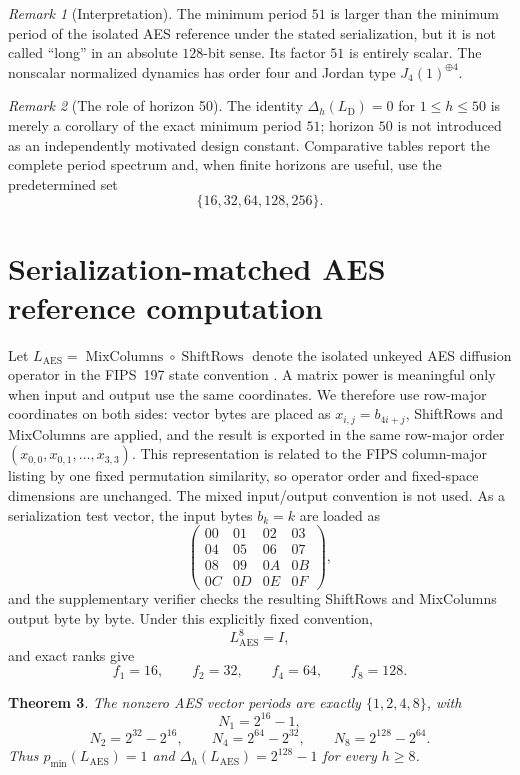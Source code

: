 \documentclass[10pt,reqno]{amsart}
\theoremstyle{plain}
\newtheorem{theorem}{Theorem}[section]
\theoremstyle{remark}\newtheorem{remark}[theorem]{Remark}
\theoremstyle{definition}\newtheorem{definition}[theorem]{Definition}
\newcommand{\AES}{\mathrm{AES}}
\begin{document}
\begin{remark}[Interpretation]
The minimum period $51$ is larger than the minimum period of the isolated AES reference under the stated serialization, but it is not called ``long'' in an absolute $128$-bit sense. Its factor $51$ is entirely scalar. The nonscalar normalized dynamics has order four and Jordan type $J_4(1)^{\oplus4}$.
\end{remark}

\begin{remark}[The role of horizon 50]
The identity $\Delta_h(L_{\mathrm{D}})=0$ for $1\le h\le50$ is merely a corollary of the exact minimum period $51$; horizon $50$ is not introduced as an independently motivated design constant. Comparative tables report the complete period spectrum and, when finite horizons are useful, use the predetermined set
\[
\{16,32,64,128,256\}.
\]
\end{remark}

\section{Serialization-matched AES reference computation}
Let $L_{\AES}=\operatorname{MixColumns}\circ\operatorname{ShiftRows}$ denote the isolated unkeyed AES diffusion operator in the FIPS~197 state convention \cite{FIPS197}. A matrix power is meaningful only when input and output use the same coordinates. We therefore use row-major coordinates on both sides: vector bytes are placed as $x_{i,j}=b_{4i+j}$, ShiftRows and MixColumns are applied, and the result is exported in the same row-major order $(x_{0,0},x_{0,1},\ldots,x_{3,3})$. This representation is related to the FIPS column-major listing by one fixed permutation similarity, so operator order and fixed-space dimensions are unchanged. The mixed input/output convention is not used. As a serialization test vector, the input bytes $b_k=k$ are loaded as
\[
\begin{pmatrix}
00&01&02&03\\04&05&06&07\\08&09&0A&0B\\0C&0D&0E&0F
\end{pmatrix},
\]
and the supplementary verifier checks the resulting ShiftRows and MixColumns output byte by byte. Under this explicitly fixed convention,
\[
L_{\AES}^8=I,
\]
and exact ranks give
\[
f_1=16,\qquad f_2=32,\qquad f_4=64,\qquad f_8=128.
\]

\begin{theorem}\label{thm:AESspectrum}
The nonzero AES vector periods are exactly $\{1,2,4,8\}$, with
\[
N_1=2^{16}-1,
\]
\[
N_2=2^{32}-2^{16},\qquad
N_4=2^{64}-2^{32},\qquad
N_8=2^{128}-2^{64}.
\]
Thus $p_{\min}(L_{\AES})=1$ and $\Delta_h(L_{\AES})=2^{128}-1$ for every $h\ge8$.
\end{theorem}
\end{document}
